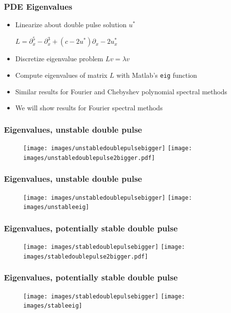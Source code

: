 \documentclass[16pt]{beamer}
\begin{document}
\begin{frame}
	\frametitle{PDE Eigenvalues}
	\fontsize{16}{7.2}\selectfont
	\begin{itemize}
		\item Linearize about double pulse solution $u^*$
		\begin{center}
		$L = \partial_x^5 - \partial_x^3 + (c - 2 u^*)\partial_x - 2 u^*_x $
		\end{center}
		\item Discretize eigenvalue problem $Lv = \lambda v$
		\vspace{0.5cm}
		\item Compute eigenvalues of matrix $L$ with Matlab's \texttt{eig} function
		\vspace{0.5cm}
		\item Similar results for Fourier and Chebyshev polynomial spectral methods
		\vspace{0.5cm}
		\item We will show results for Fourier spectral methods
	\end{itemize}
\end{frame}

\begin{frame}
	\frametitle{Eigenvalues, unstable double pulse}
	\fontsize{16}{7.2}\selectfont
	\begin{figure}
   		\texttt{[image: images/unstabledoublepulsebigger]}
   		\hfill
   		\texttt{[image: images/unstabledoublepulse2bigger.pdf]}
	\end{figure}
\end{frame}

\begin{frame}
	\frametitle{Eigenvalues, unstable double pulse}
	\fontsize{16}{7.2}\selectfont
	\begin{figure}
   		\texttt{[image: images/unstabledoublepulsebigger]}
   		\hfill
   		\texttt{[image: images/unstableeig]}
	\end{figure}
\end{frame}

\begin{frame}
	\frametitle{Eigenvalues, potentially stable double pulse}
	\fontsize{16}{7.2}\selectfont
	\begin{figure}
   		\texttt{[image: images/stabledoublepulsebigger]}
   		\hfill
   		\texttt{[image: images/stabledoublepulse2bigger.pdf]}
	\end{figure}
\end{frame}

\begin{frame}
	\frametitle{Eigenvalues, potentially stable double pulse}
	\fontsize{16}{7.2}\selectfont
	\begin{figure}
   		\texttt{[image: images/stabledoublepulsebigger]}
   		\hfill
   		\texttt{[image: images/stableeig]}
	\end{figure}
\end{frame}
\end{document}
